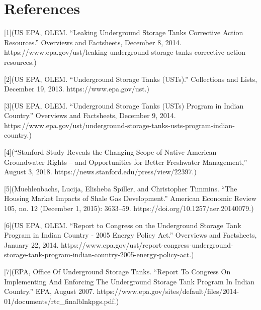 \documentclass[12pt]{article}
\begin{document}
\newpage
\section{References}




[1](US EPA, OLEM. “Leaking Underground Storage Tanks Corrective Action Resources.” Overviews and Factsheets, December 8, 2014. https://www.epa.gov/ust/leaking-underground-storage-tanks-corrective-action-resources.)

[2](US EPA, OLEM. “Underground Storage Tanks (USTs).” Collections and Lists, December 19, 2013. https://www.epa.gov/ust.)

[3](US EPA, OLEM. “Underground Storage Tanks (USTs) Program in Indian Country.” Overviews and Factsheets, December 9, 2014. https://www.epa.gov/ust/underground-storage-tanks-usts-program-indian-country.)

[4](“Stanford Study Reveals the Changing Scope of Native American Groundwater Rights – and Opportunities for Better Freshwater Management,” August 3, 2018. https://news.stanford.edu/press/view/22397.)

[5](Muehlenbachs, Lucija, Elisheba Spiller, and Christopher Timmins. “The Housing Market Impacts of Shale Gas Development.” American Economic Review 105, no. 12 (December 1, 2015): 3633–59. https://doi.org/10.1257/aer.20140079.)

[6](US EPA, OLEM. “Report to Congress on the Underground Storage Tank Program in Indian Country - 2005 Energy Policy Act.” Overviews and Factsheets, January 22, 2014. https://www.epa.gov/ust/report-congress-underground-storage-tank-program-indian-country-2005-energy-policy-act.)

[7](EPA, Office Of Underground Storage Tanks. “Report To Congress On Implementing And Enforcing The Underground Storage Tank Program In Indian Country.” EPA, August 2007. https://www.epa.gov/sites/default/files/2014-01/documents/rtc\_finalblnkpgs.pdf.)
\end{document}
